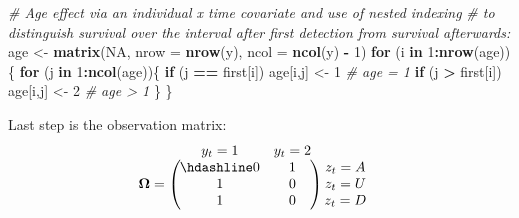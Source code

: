 \documentclass[
  12pt,
]{krantz}
\newenvironment{Shaded}{\begin{snugshade}}{\end{snugshade}}
\newcommand{\AttributeTok}[1]{\textcolor[rgb]{0.13,0.29,0.53}{#1}}
\newcommand{\CommentTok}[1]{\textcolor[rgb]{0.56,0.35,0.01}{\textit{#1}}}
\newcommand{\ConstantTok}[1]{\textcolor[rgb]{0.56,0.35,0.01}{#1}}
\newcommand{\ControlFlowTok}[1]{\textcolor[rgb]{0.13,0.29,0.53}{\textbf{#1}}}
\newcommand{\DecValTok}[1]{\textcolor[rgb]{0.00,0.00,0.81}{#1}}
\newcommand{\FunctionTok}[1]{\textcolor[rgb]{0.13,0.29,0.53}{\textbf{#1}}}
\newcommand{\NormalTok}[1]{#1}
\newcommand{\OtherTok}[1]{\textcolor[rgb]{0.56,0.35,0.01}{#1}}
\newcommand{\SpecialCharTok}[1]{\textcolor[rgb]{0.81,0.36,0.00}{\textbf{#1}}}
\begin{document}
\begin{Shaded}
\begin{Highlighting}[]
\CommentTok{\# Age effect via an individual x time covariate and use of nested indexing }
\CommentTok{\# to distinguish survival over the interval after first detection from survival afterwards: }
\NormalTok{age }\OtherTok{\textless{}{-}} \FunctionTok{matrix}\NormalTok{(}\ConstantTok{NA}\NormalTok{, }\AttributeTok{nrow =} \FunctionTok{nrow}\NormalTok{(y), }\AttributeTok{ncol =} \FunctionTok{ncol}\NormalTok{(y) }\SpecialCharTok{{-}} \DecValTok{1}\NormalTok{)}
\ControlFlowTok{for}\NormalTok{ (i }\ControlFlowTok{in} \DecValTok{1}\SpecialCharTok{:}\FunctionTok{nrow}\NormalTok{(age))\{}
  \ControlFlowTok{for}\NormalTok{ (j }\ControlFlowTok{in} \DecValTok{1}\SpecialCharTok{:}\FunctionTok{ncol}\NormalTok{(age))\{}
    \ControlFlowTok{if}\NormalTok{ (j }\SpecialCharTok{==}\NormalTok{ first[i]) age[i,j] }\OtherTok{\textless{}{-}} \DecValTok{1} \CommentTok{\# age = 1}
    \ControlFlowTok{if}\NormalTok{ (j }\SpecialCharTok{\textgreater{}}\NormalTok{ first[i]) age[i,j] }\OtherTok{\textless{}{-}} \DecValTok{2}  \CommentTok{\# age \textgreater{} 1}
\NormalTok{  \}}
\NormalTok{\}}
\end{Highlighting}
\end{Shaded}

Last step is the observation matrix:
\[\begin{matrix}
& \\
\mathbf{\Omega} =
\left ( \vphantom{ \begin{matrix} 12 \\ 12 \\ 12 \end{matrix} } \right .
\end{matrix}
\hspace{-1.2em}
\begin{matrix}
y_t=1 & y_t=2 \\ \hdashline
0 & 1 \\
1 & 0 \\
1 & 0 
\end{matrix}
\hspace{-0.2em}
\begin{matrix}
& \\
\left . \vphantom{ \begin{matrix} 12 \\ 12 \\ 12 \end{matrix} } \right )
\begin{matrix}
z_{t}=A \\ z_{t}=U \\ z_{t}=D
\end{matrix}
\end{matrix}\]
\end{document}
